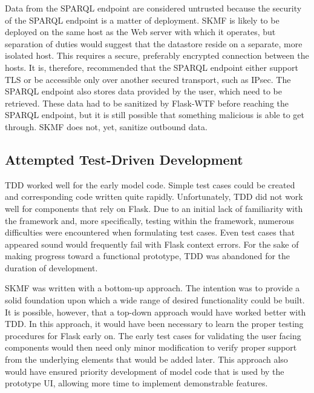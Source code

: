 Data from the SPARQL endpoint are considered untrusted because the security of the SPARQL endpoint is a matter of deployment. SKMF is likely to be deployed on the same host as the Web server with which it operates, but separation of duties would suggest that the datastore reside on a separate, more isolated host. This requires a secure, preferably encrypted connection between the hosts. It is, therefore, recommended that the SPARQL endpoint either support TLS or be accessible only over another secured transport, such as IPsec. The SPARQL endpoint also stores data provided by the user, which need to be retrieved. These data had to be sanitized by Flask-WTF before reaching the SPARQL endpoint, but it is still possible that something malicious is able to get through. SKMF does not, yet, sanitize outbound data.


\subsection{Attempted Test-Driven Development}
\label{method:tdd}

TDD worked well for the early model code. Simple test cases could be created and corresponding code written quite rapidly. Unfortunately, TDD did not work well for components that rely on Flask. Due to an initial lack of familiarity with the framework and, more specifically, testing within the framework, numerous difficulties were encountered when formulating test cases. Even test cases that appeared sound would frequently fail with Flask context errors. For the sake of making progress toward a functional prototype, TDD was abandoned for the duration of development.

SKMF was written with a bottom-up approach. The intention was to provide a solid foundation upon which a wide range of desired functionality could be built. It is possible, however, that a top-down approach would have worked better with TDD. In this approach, it would have been necessary to learn the proper testing procedures for Flask early on. The early test cases for validating the user facing components would then need only minor modification to verify proper support from the underlying elements that would be added later. This approach also would have ensured priority development of model code that is used by the prototype UI, allowing more time to implement demonstrable features.
